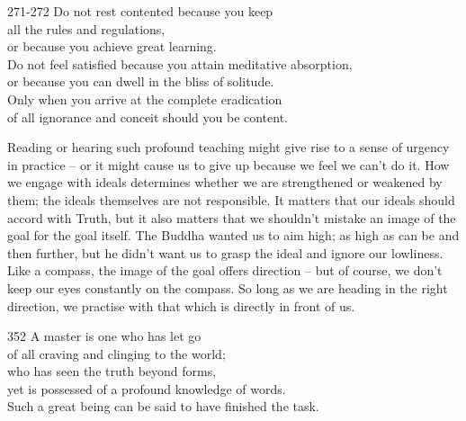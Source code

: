 
\begin{dhpVerse}{271-272}
\label{dhp-271}\label{dhp-272}
Do not rest contented because you keep\\
all the rules and regulations,\\
or because you achieve great learning.\\
Do not feel satisfied because you attain meditative absorption,\\
or because you can dwell in the bliss of solitude.\\
Only when you arrive at the complete eradication\\
of all ignorance and conceit should you be content.
\end{dhpVerse}

\begin{dhpRefl}
  Reading or hearing such profound teaching might give rise to a sense of
  urgency in practice -- or it might cause us to give up because we feel we can’t
  do it. How we engage with ideals determines whether we are strengthened or
  weakened by them; the ideals themselves are not responsible. It matters that
  our ideals should accord with Truth, but it also matters that we shouldn't
  mistake an image of the goal for the goal itself. The Buddha wanted us to aim
  high; as high as can be and then further, but he didn’t want us to grasp the
  ideal and ignore our lowliness. Like a compass, the image of the goal offers
  direction -- but of course, we don’t keep our eyes constantly on the compass.
  So long as we are heading in the right direction, we practise with that which
  is directly in front of us.
\end{dhpRefl}


\begin{dhpVerse}{352}
\label{dhp-352}
A master is one who has let go\\
of all craving and clinging to the world;\\
who has seen the truth beyond forms,\\
yet is possessed of a profound knowledge of words.\\
Such a great being can be said to have finished the task.
\end{dhpVerse}

